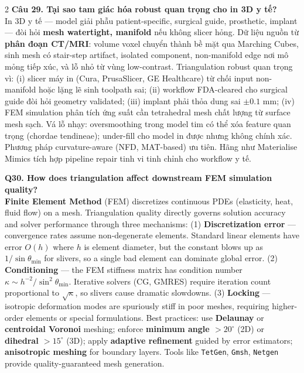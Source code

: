 \begin{paracol}{2}
\textbf{Câu 29. Tại sao tam giác hóa robust quan trọng cho in 3D y tế?}\\
In 3D y tế — model giải phẫu patient-specific, surgical guide, prosthetic, implant — đòi hỏi \textbf{mesh watertight, manifold} nếu không slicer hỏng. Dữ liệu nguồn từ \textbf{phân đoạn CT/MRI}: volume voxel chuyển thành bề mặt qua Marching Cubes, sinh mesh có stair-step artifact, isolated component, non-manifold edge nơi mô mỏng tiếp xúc, và lỗ nhỏ từ vùng low-contrast. Triangulation robust quan trọng vì: (i) slicer máy in (Cura, PrusaSlicer, GE Healthcare) từ chối input non-manifold hoặc lặng lẽ sinh toolpath sai; (ii) workflow FDA-cleared cho surgical guide đòi hỏi geometry validated; (iii) implant phải thỏa dung sai $\pm 0.1$ mm; (iv) FEM simulation phân tích ứng suất cần tetrahedral mesh chất lượng từ surface mesh sạch. Vá lỗ nhạy: oversmoothing trong model tim có thể xóa feature quan trọng (chordae tendineae); under-fill cho model in được nhưng không chính xác. Phương pháp curvature-aware (NFD, MAT-based) ưu tiên. Hãng như Materialise Mimics tích hợp pipeline repair tinh vi tinh chỉnh cho workflow y tế.

\switchcolumn*

\textbf{Q30. How does triangulation affect downstream FEM simulation quality?}\\
\textbf{Finite Element Method} (FEM) discretizes continuous PDEs (elasticity, heat, fluid flow) on a mesh. Triangulation quality directly governs solution accuracy and solver performance through three mechanisms: (1) \textbf{Discretization error} — convergence rates assume non-degenerate elements. Standard linear elements have error $O(h)$ where $h$ is element diameter, but the constant blows up as $1/\sin\theta_{\min}$ for slivers, so a single bad element can dominate global error. (2) \textbf{Conditioning} — the FEM stiffness matrix has condition number $\kappa \sim h^{-2}/\sin^2\theta_{\min}$. Iterative solvers (CG, GMRES) require iteration count proportional to $\sqrt{\kappa}$, so slivers cause dramatic slowdowns. (3) \textbf{Locking} — isotropic deformation modes are spuriously stiff in poor meshes, requiring higher-order elements or special formulations. Best practices: use \textbf{Delaunay} or \textbf{centroidal Voronoi} meshing; enforce \textbf{minimum angle $> 20^\circ$} (2D) or \textbf{dihedral $> 15^\circ$} (3D); apply \textbf{adaptive refinement} guided by error estimators; \textbf{anisotropic meshing} for boundary layers. Tools like \texttt{TetGen}, \texttt{Gmsh}, \texttt{Netgen} provide quality-guaranteed mesh generation.


\end{paracol}
